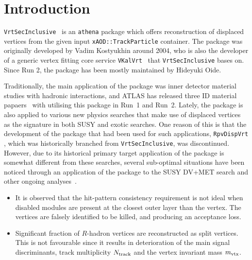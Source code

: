 \documentclass[NOTE, atlasdraft=true, texlive=2018, UKenglish]{\ATLASLATEXPATH atlasdoc}
\begin{document}
\maketitle

\tableofcontents


\section{Introduction}
\label{sec:intro}

{\tt VrtSecInclusive}~\cite{} is an {\tt athena} package which offers reconstruction of displaced vertices from the given input {\tt xAOD::TrackParticle} container. The package was originally developed by Vadim Kostyukhin around 2004, who is also the developer of a generic vertex fitting core service {\tt VKalVrt}~\cite{} that {\tt VrtSecInclusive} bases on. Since Run 2, the package has been mostly maintained by Hideyuki Oide.

Traditionally, the main application of the package was inner detector material studies with hadronic interactions, and ATLAS has released three ID material papaers~\cite{} with utilising this package in Run~1 and Run~2. Lately, the package is also applied to various new physics searches that make use of displaced vertices as the signature in both SUSY and exotic searches. One reason of this is that the development of the package that had been used for such applications, {\tt RpvDispVrt} \cite{}, which was historically branched from {\tt VrtSecInclusive}, was discontinued. However, due to its historical primary target application of the package is somewhat different from these searches, several sub-optimal situations have been noticed through an application of the package to the SUSY DV+MET search and other ongoing analyses~\cite{}.

\begin{itemize}
  \item It is observed that the hit-pattern consistency requirement is not ideal when disabled modules are present at the closest outer layer than the vertex. The vertices are falsely identified to be killed, and producing an acceptance loss.
  \item Significant fraction of $R$-hadron vertices are reconstructed as split vertices. This is not favourable since it results in deterioration of the main signal discriminants, track multiplicity $N_{\rm track}$ and the vertex invariant mass $m_{\rm vtx}$.
\end{itemize}
\end{document}
